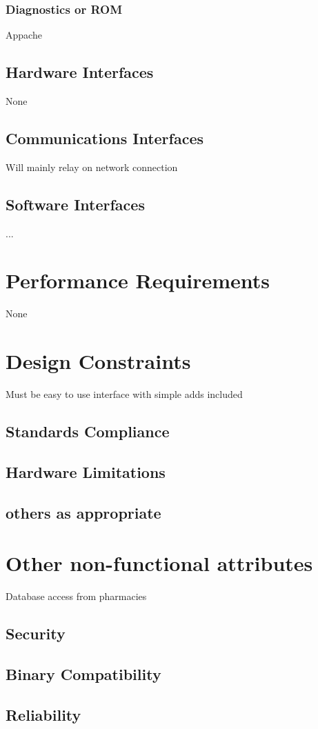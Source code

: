 \documentclass[]{article}
\begin{document}
\subsubsection {Diagnostics or ROM}
Appache

\subsection{Hardware Interfaces}
None
\subsection{Communications Interfaces}
Will mainly relay on network connection
\subsection{Software Interfaces}
... 
\section{Performance Requirements}
None
\section{Design Constraints}
Must be easy to use interface with simple adds included 
\subsection{ Standards Compliance}
\subsection{ Hardware Limitations}
\subsection{ others as appropriate}

\section{Other non-functional attributes}
Database access from pharmacies
\subsection {Security}
\subsection {Binary Compatibility}
\subsection {Reliability}
\end{document}
